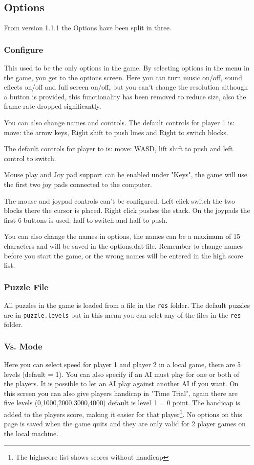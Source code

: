 \documentclass[11pt,a4paper]{article}
\begin{document}
\subsection{Options}
From version 1.1.1 the Options have been split in three.
\subsubsection{Configure}
This used to be the only options in the game.
By selecting options in the menu in the game, you get to the
options screen. Here you can turn music on/off, sound effects
on/off and full screen on/off, but you can't change the
resolution although a button is provided, this functionality has
been removed to reduce size, also the frame rate dropped
significantly.

You can also change names and controls. The default controls for
player 1 is: move: the arrow keys, Right shift to push lines and
Right  to switch blocks.

The default controls for player to is: move: WASD, lift shift to
push and left control to switch.

Mouse play and Joy pad support can be enabled under "Keys", the game
will use the first two joy pads connected to the computer.

The mouse and joypad controls can't be configured. Left click
switch the two blocks there the cursor is placed. Right click
pushes the stack. On the joypads the first 6 buttons is used, half
to switch and half to push.

You can also change the names in options, the names can be a
maximum of 15 characters and will be saved in the options.dat
file. Remember to change names before you start the game, or the
wrong names will be entered in the high score list.
\subsubsection{Puzzle File}
All puzzles in the game is loaded from a file in the \verb+res+ folder. The default puzzles are in \verb+puzzle.levels+ but in this menu you can selct any of the files in the \verb+res+ folder.
\subsubsection{Vs. Mode}
Here you can select speed for player 1 and player 2 in a local game, there are 5 levels (default = 1). You can also specify if an AI must play for one or both of the players. It is possible to let an AI play against another AI if you want. On this screen you can also give players handicap in "Time Trial", again there are five levels (0,1000,2000,3000,4000) default is level 1 = 0 point. The handicap is added to the players score, making it easier for that player\footnote{The highscore list shows scores without handicap}. \newline
No options on this page is saved when the game quits and they are only valid for 2 player games on the local machine.
\end{document}
